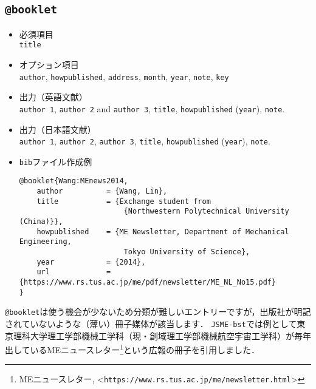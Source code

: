\documentclass[a4paper,fleqn,uplatex,dvipdfmx]{jsarticle}
\makeatletter
\newcommand{\JSMErepos}{\texttt{JSME-bst}}
\newcommand{\ttbooklet}{\texttt{@booklet}}
\makeatother
\begin{document}
\subsection{\ttbooklet}
\label{ssec:booklet}
\begin{screen}
    \begin{itemize}
        \item 必須項目 \\
        \verb|title|
        \item オプション項目 \\
        \verb|author|, \verb|howpublished|, \verb|address|, \verb|month|, \verb|year|, \verb|note|, \verb|key|
        \item 出力（英語文献） \\
            \colorbox[gray]{0.8}{\texttt{author 1}}, \colorbox[gray]{0.8}{\texttt{author 2}} and \colorbox[gray]{0.8}{\texttt{author 3}}, \colorbox[gray]{0.8}{\texttt{title}}, \colorbox[gray]{0.8}{\texttt{howpublished}} (\colorbox[gray]{0.8}{\texttt{year}}), \colorbox[gray]{0.8}{\texttt{note}}.
        \item 出力（日本語文献） \\
            \colorbox[gray]{0.8}{\texttt{author 1}}, \colorbox[gray]{0.8}{\texttt{author 2}}, \colorbox[gray]{0.8}{\texttt{author 3}}, \colorbox[gray]{0.8}{\texttt{title}}, \colorbox[gray]{0.8}{\texttt{howpublished}} (\colorbox[gray]{0.8}{\texttt{year}}), \colorbox[gray]{0.8}{\texttt{note}}.
        \item \verb|bib|ファイル作成例 \vspace{-3mm}
\begin{verbatim}
@booklet{Wang:MEnews2014,
    author          = {Wang, Lin},
    title           = {Exchange student from 
                        {Northwestern Polytechnical University (China)}},
    howpublished    = {ME Newsletter, Department of Mechanical Engineering, 
                        Tokyo University of Science},
    year            = {2014},
    url             = {https://www.rs.tus.ac.jp/me/pdf/newsletter/ME_NL_No15.pdf}
}
\end{verbatim}
    \end{itemize}
\end{screen}

\ttbooklet は使う機会が少ないため分類が難しいエントリーですが，出版社が明記されていないような（薄い）冊子媒体が該当します．
\JSMErepos では例として東京理科大学理工学部機械工学科（現・創域理工学部機械航空宇宙工学科）が毎年出しているMEニュースレター\footnote{MEニュースレター, \textless\verb|https://www.rs.tus.ac.jp/me/newsletter.html|\textgreater}という広報の冊子を引用しました．
\end{document}
